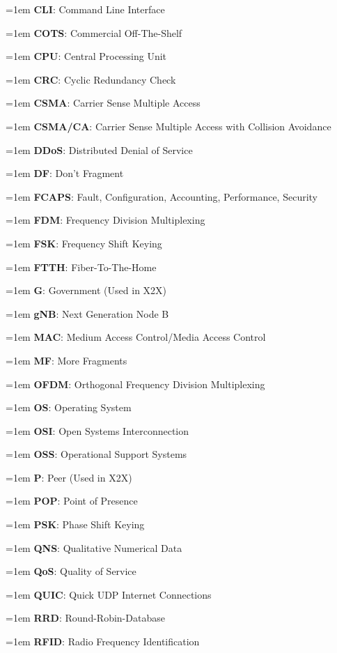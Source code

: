 \documentclass[letterpaper,8pt]{extarticle}
\newcommand{\definition}[2]{
  \hangindent=1em
  \textbf{#1}: #2%
}
\begin{document}
\begin{multicols*}{5}
\begin{multicols*}{2}
    \definition{CLI}{Command Line Interface}
    
    \definition{COTS}{Commercial Off-The-Shelf}
    
    \definition{CPU}{Central Processing Unit}
    
    \definition{CRC}{Cyclic Redundancy Check}
    
    \definition{CSMA}{Carrier Sense Multiple Access}
    
    \definition{CSMA/CA}{Carrier Sense Multiple Access with Collision Avoidance}
    
    \definition{DDoS}{Distributed Denial of Service}
    
    \definition{DF}{Don't Fragment}
    
    \definition{FCAPS}{Fault, Configuration, Accounting, Performance, Security}
    
    \definition{FDM}{Frequency Division Multiplexing}
    
    \definition{FSK}{Frequency Shift Keying}
    
    \definition{FTTH}{Fiber-To-The-Home}
    
    \definition{G}{Government (Used in X2X)}
    
    \definition{gNB}{Next Generation Node B}
    
    \definition{MAC}{Medium Access Control/Media Access Control}
    
    \definition{MF}{More Fragments}
    
    \definition{OFDM}{Orthogonal Frequency Division Multiplexing}
    
    \definition{OS}{Operating System}
    
    \definition{OSI}{Open Systems Interconnection}
    
    \definition{OSS}{Operational Support Systems}
    
    \definition{P}{Peer (Used in X2X)}
    
    \definition{POP}{Point of Presence}
    
    \definition{PSK}{Phase Shift Keying}
    
    \definition{QNS}{Qualitative Numerical Data}
    
    \definition{QoS}{Quality of Service}
    
    \definition{QUIC}{Quick UDP Internet Connections}
    
    \definition{RRD}{Round-Robin-Database}
    
    \definition{RFID}{Radio Frequency Identification}
    

\end{multicols*}
\end{multicols*}
\end{document}
